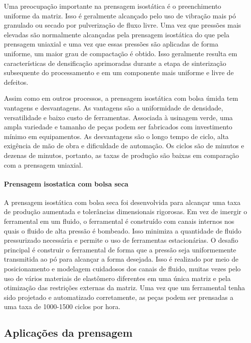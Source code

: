 Uma preocupação importante na prensagem isostática é o preenchimento uniforme da matriz. Isso é geralmente alcançado pelo uso de vibração mais pó granulado ou secado por pulverização de fluxo livre. Uma vez que pressões mais elevadas são normalmente alcançadas pela prensagem isostática do que pela prensagem uniaxial e uma vez que essas pressões são aplicadas de forma uniforme, um maior grau de compactação é obtido. Isso geralmente resulta em características de densificação aprimoradas durante a etapa de sinterização subsequente do processamento e em um componente mais uniforme e livre de defeitos.

Assim como em outros processos, a prensagem isostática com bolsa úmida tem vantagens e desvantagens. As vantagens são a uniformidade de densidade, versatilidade e baixo custo de ferramentas. Associada à usinagem verde, uma ampla variedade e tamanho de peças podem ser fabricados com investimento mínimo em equipamentos. As desvantagens são o longo tempo de ciclo, alta exigência de mão de obra e dificuldade de automação. Os ciclos são de minutos e dezenas de minutos, portanto, as taxas de produção são baixas em comparação com a prensagem uniaxial.

\paragraph*{Prensagem isostatica com bolsa seca}

A prensagem isostática com bolsa seca foi desenvolvida para alcançar uma taxa de produção aumentada e tolerâncias dimensionais rigorosas. Em vez de imergir o ferramental em um fluido, o ferramental é construído com canais internos nos quais o fluido de alta pressão é bombeado. Isso minimiza a quantidade de fluido pressurizado necessária e permite o uso de ferramentas estacionárias. O desafio principal é construir o ferramental de forma que a pressão seja uniformemente transmitida ao pó para alcançar a forma desejada. Isso é realizado por meio de posicionamento e modelagem cuidadosos dos canais de fluido, muitas vezes pelo uso de vários materiais de elastômero diferentes em uma única matriz e pela otimização das restrições externas da matriz. Uma vez que um ferramental tenha sido projetado e automatizado corretamente, as peças podem ser prensadas a uma taxa de 1000-1500 ciclos por hora.

\subsection*{Aplicações da prensagem}

